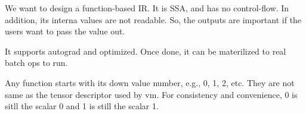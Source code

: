 We want to design a function-based IR. It is SSA, and has no control-flow.
In addition, its interna values are not readable. So, the outputs are important
if the users want to pass the value out.

It supports autograd and optimized. Once done, it can be materilized to real
batch ops to run.

Any function starts with its down value number, e.g., 0, 1, 2, etc. They are not
same as the tensor descriptor used by vm. For consistency and convenience, 0 is
sitll the scalar 0 and 1 is still the scalar 1.


